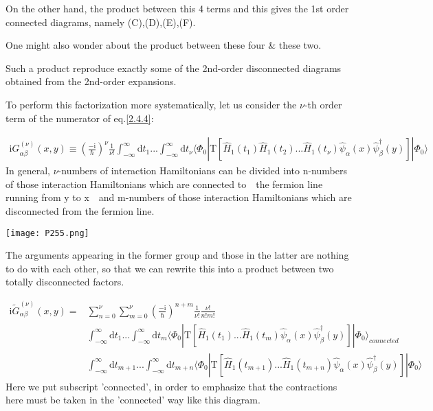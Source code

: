 On the other hand, the product between this 4 terms and this gives the 1st order connected diagrams, namely (C),(D),(E),(F).

One might also wonder about the product between these four \& these two.

Such a product reproduce exactly some of the 2nd-order disconnected diagrams obtained from the 2nd-order expansions.

To perform this factorization more systematically, let us consider the $\nu$-th order term of the numerator of eq.\eqref{2.4.4}:

\begin{align}
\mathrm{i}G_{\alpha\beta}^{(\nu)}(x,y)\equiv(\frac{-\mathrm{i}}{\hbar})^{\nu}\frac{1}{\nu!}\int_{-\infty}^{\infty}\mathrm{d}t_1...\int_{-\infty}^{\infty}\mathrm{d}t_{\nu}\langle\Phi_0|\mathrm{T}[\hat H_1(t_1)\hat H_1(t_2)...\hat H_1(t_{\nu})\hat \psi_{\alpha}(x)\hat \psi^{\dagger}_{\beta}(y)]|\Phi_0\rangle \nonumber
\end{align}
In general, $\nu$-numbers of interaction Hamiltonians can be divided into n-numbers of those interaction Hamiltonians which are connected to\ \ the fermion line running from y to x\ \ and m-numbers of those interaction Hamiltonians which are disconnected from the fermion line.
\begin{center}
\texttt{[image: P255.png]}
\end{center}
The arguments appearing in the former group and those in the latter are nothing to do with each other, so that we can rewrite this into a product between two totally disconnected factors.

\begin{align}
\mathrm{i}\tilde{G}_{\alpha\beta}^{(\nu)}(x,y)=& \sum_{n=0}^{\nu}\sum_{m=0}^{\nu}(\frac{-\mathrm{i}}{\hbar})^{n+m}\frac{1}{\nu!}\frac{\nu!}{n!m!} \nonumber \\
&\int_{-\infty}^{\infty}\mathrm{d}t_1...\int_{-\infty}^{\infty}\mathrm{d}t_{m}\langle\Phi_0|\mathrm{T}[\hat H_1(t_1)...\hat H_1(t_{m})\hat \psi_{\alpha}(x)\hat \psi^{\dagger}_{\beta}(y)]|\Phi_0\rangle_{connected} \nonumber \\
&\int_{-\infty}^{\infty}\mathrm{d}t_{m+1}...\int_{-\infty}^{\infty}\mathrm{d}t_{m+n}\langle\Phi_0|\mathrm{T}[\hat H_1(t_{m+1})...\hat H_1(t_{m+n})\hat \psi_{\alpha}(x)\hat \psi^{\dagger}_{\beta}(y)]|\Phi_0\rangle \nonumber 
\end{align}
Here we put subscript 'connected', in order to emphasize that the contractions here must be taken in the 'connected' way like this diagram.

